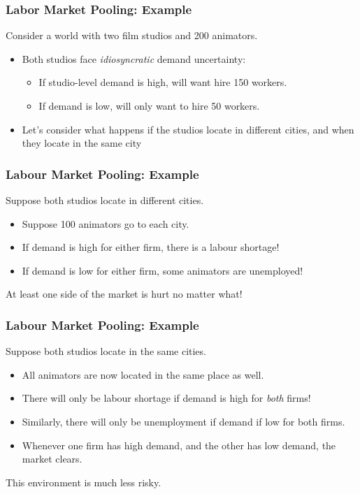 \documentclass{beamer}
\begin{document}
\begin{frame}
	\frametitle{Labor Market Pooling: Example}
Consider a world with two film studios and 200 animators.
	\begin{itemize}
		\item Both studios face \emph{idiosyncratic} demand uncertainty:
			\begin{itemize}
				\item If studio-level demand is high, will want hire 150 workers.
				\item If demand is low, will only want to hire 50 workers.
			\end{itemize}
		\item Let's consider what happens if the studios locate in different cities, and when they locate in the same city
	\end{itemize}


\end{frame}

\begin{frame}
	\frametitle{Labour Market Pooling: Example}
Suppose both studios locate in different cities.
			\begin{itemize}
				\item Suppose 100 animators go to each city.
				\item If demand is high for either firm, there is a labour shortage!
				\item If demand is low for either firm, some animators are unemployed!
			\end{itemize}
At least one side of the market is hurt no matter what!
\end{frame}

\begin{frame}
	\frametitle{Labour Market Pooling: Example}
	Suppose both studios locate in the same cities.
	\begin{itemize}
		\item All animators are now located in the same place as well.
		\item There will only be labour shortage if demand is high for \emph{both} firms!
		\item Similarly, there will only be unemployment if demand if low for both firms. 
		\item Whenever one firm has high demand, and the other has low demand, the market clears.
	\end{itemize}
	This environment is much less risky. 

\end{frame}
\end{document}
